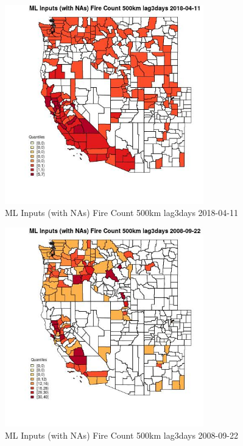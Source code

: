 \clearpage 

\begin{figure} 
\centering  
\includegraphics[width=0.77\textwidth]{Code_Outputs/Report_ML_input_PM25_Step4_part_e_de_duplicated_aves_compiled_2019-05-18wNAs_CountyFire_Count_500km_lag3daysMean2018-04-11_2018-04-11.jpg} 
\caption{\label{fig:Report_ML_input_PM25_Step4_part_e_de_duplicated_aves_compiled_2019-05-18wNAsCountyFire_Count_500km_lag3daysMean2018-04-11_2018-04-11}ML Inputs (with NAs) Fire Count 500km lag3days 2018-04-11} 
\end{figure} 
 

\begin{figure} 
\centering  
\includegraphics[width=0.77\textwidth]{Code_Outputs/Report_ML_input_PM25_Step4_part_e_de_duplicated_aves_compiled_2019-05-18wNAs_CountyFire_Count_500km_lag3daysMean2008-09-22_2008-09-22.jpg} 
\caption{\label{fig:Report_ML_input_PM25_Step4_part_e_de_duplicated_aves_compiled_2019-05-18wNAsCountyFire_Count_500km_lag3daysMean2008-09-22_2008-09-22}ML Inputs (with NAs) Fire Count 500km lag3days 2008-09-22} 
\end{figure} 
 

